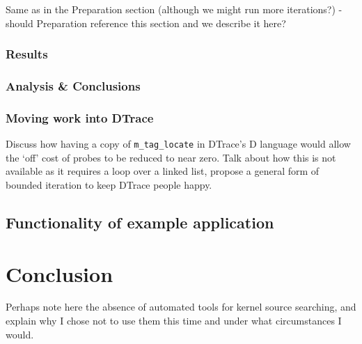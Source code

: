 \documentclass[a4paper,12pt,twoside,openright]{report}
\begin{document}
	Same as in the Preparation section (although we might run more iterations?) - should Preparation reference this section and we describe it here?
	
	\subsection{Results}
	
	\subsection{Analysis \& Conclusions}
	
	\subsection{Moving work into DTrace}
	
	Discuss how having a copy of \verb|m_tag_locate| in DTrace's D language would allow the `off' cost of probes to be reduced to near zero. Talk about how this is not available as it requires a loop over a linked list, propose a general form of bounded iteration to keep DTrace people happy.
	
	\section{Functionality of example application}
	
	\chapter{Conclusion}
	
	Perhaps note here the absence of automated tools for kernel source searching, and explain why I chose not to use them this time and under what circumstances I would.
	
	
	
	
\end{document}
